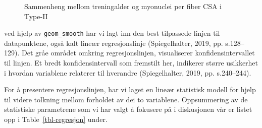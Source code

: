 \documentclass[
  letterpaper,
  DIV=11,
  numbers=noendperiod]{scrartcl}
\begin{document}
\begin{figure}[H]


\caption{\label{fig-plot-training-age-myonuclei}Sammenheng mellom
treningalder og myonuclei per fiber CSA i Type-II}

\end{figure}%

ved hjelp av \texttt{geom\_smooth} har vi lagt inn den best tilpassede
linjen til datapunktene, også kalt lineær regresjonslinje
(Spiegelhalter, 2019, pp. s.128--129). Det gråe området omkring
regresjonslinjen, visualiserer konfidensintervallet til linjen. Et bredt
konfidensintervall som fremstilt her, indikerer større usikkerhet i
hvordan variablene relaterer til hverandre (Spiegelhalter, 2019, pp.
s.240--244).

For å presentere regresjonslinjen, har vi laget en lineær statistisk
modell for hjelp til videre tolkning mellom forholdet av dei to
variablene. Oppsummering av de statistiske parametrene som vi har valgt
å fokusere på i diskusjonen vår er listet opp i
Table~\ref{tbl-regresjon} under.
\end{document}

